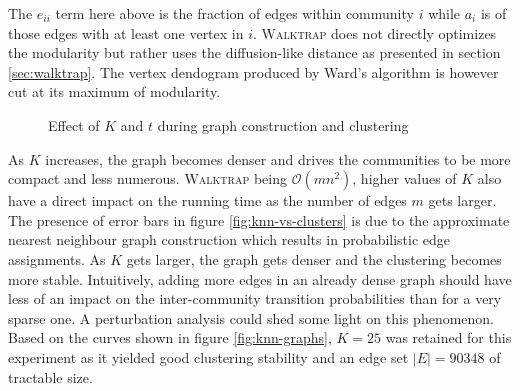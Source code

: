 The $e_{ii}$ term here above is the fraction of edges within community $i$ while $a_i$ is of those edges with at least one vertex in $i$. \textsc{Walktrap} does not directly optimizes the modularity but rather uses the diffusion-like distance as presented in section \ref{sec:walktrap}.
The vertex dendogram produced by Ward's algorithm is however cut at its maximum of modularity. 

\begin{figure}
\centering
{}\hspace{2mm}%
\label{fig:pinball-graph}
\caption{Effect of $K$ and $t$ during graph construction and clustering}
\end{figure}

As $K$ increases, the graph becomes denser and drives the communities to be more compact and less numerous. \textsc{Walktrap} being $\mathcal{O}(mn^2)$, higher values of $K$ also have a direct impact on the running time as the number of edges $m$ gets larger. The presence of error bars in figure \ref{fig:knn-vs-clusters} is due to the approximate nearest neighbour graph construction which results in probabilistic edge assignments. As $K$ gets larger, the graph gets denser and the clustering becomes more stable. Intuitively, adding more edges in an already dense graph should have less of an impact on the inter-community transition probabilities than for a very sparse one. A perturbation analysis could shed some light on this phenomenon. Based on the curves shown in figure \ref{fig:knn-graphs}, $K=25$ was retained for this experiment as it yielded good clustering stability and an edge set $|E| = 90348$ of tractable size. 

